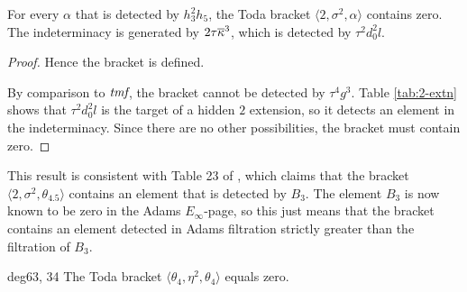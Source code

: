 \begin{lemma}
\label{lem:2,sigma^2,theta4.5}
For every $\alpha$ that is detected by $h_3^2 h_5$,
the Toda bracket $\langle 2, \sigma^2, \alpha \rangle$
contains zero.  The indeterminacy is generated by 
$2 \tau \overline{\kappa}^3$, which is detected by $\tau^2 d_0^2 l$.
\end{lemma}

\begin{proof}
Hence the bracket is defined.

By comparison to $\textit{tmf}$, the bracket cannot be detected
by $\tau^4 g^3$. 
Table \ref{tab:2-extn} shows that
$\tau^2 d_0^2 l$ is the target of a hidden $2$ extension, so it
detects an element in the indeterminacy.
Since there are no other possibilities, the bracket must
contain zero.
\end{proof}

\begin{remark}
This result is consistent with Table 23 of \cite{Isaksen14c},
which claims that the bracket
$\langle 2, \sigma^2, \theta_{4.5} \rangle$
contains an element that is detected by $B_3$.
The element $B_3$ is now known to be zero in the Adams $E_\infty$-page,
so this just means that the bracket contains an element detected
in Adams filtration strictly greater than the filtration of $B_3$.
\end{remark}

\begin{lemma}
\label{lem:theta4,eta^2,theta4}
deg{63, 34}
The Toda bracket $\langle \theta_4, \eta^2, \theta_4 \rangle$
equals zero.
\end{lemma}

